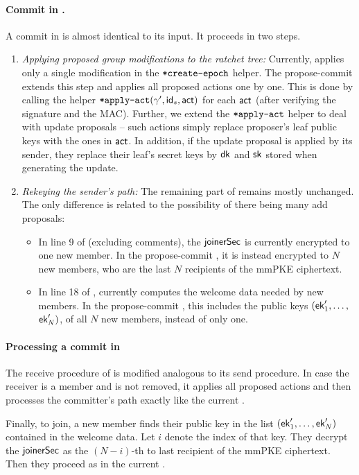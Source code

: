 \paragraph{Commit in \saik.}
A commit in \saik is almost identical to its  input. It proceeds in two steps.
\begin{enumerate}
	\item {\it Applying proposed group modifications to the ratchet tree:} Currently, \saik applies only a single modification in the ${\textnormal{\tt*create-epoch}}$ helper. The propose-commit \saik extends this step and applies all proposed actions one by one. This is done by calling the helper ${\textnormal{\tt*apply-act}}(\gamma', {\mathsf{id}}_s, \mathsf{act})$ for each $\mathsf{act}$ (after verifying the signature and the MAC). Further, we extend the ${\textnormal{\tt*apply-act}}$ helper to deal with update proposals -- such actions simply replace proposer's leaf public keys with the ones in $\mathsf{act}$. In addition, if the update proposal is applied by its sender, they replace their leaf's secret keys by ${\mathsf{dk}}$ and ${\mathsf{sk}}$ stored when generating the update.
	\item {\it Rekeying the sender's path:} The remaining part of  remains mostly unchanged. The only difference is related to the possibility of there being many add proposals:
	\begin{itemize}
		\item In line 9 of  (excluding comments), the ${\mathsf{joinerSec}}$ is currently encrypted to one new member. In the propose-commit \saik, it is instead encrypted to $N$ new members, who are the last $N$ recipients of the mmPKE ciphertext.
		\item In line 18 of , \saik currently computes the welcome data needed by new members. In the propose-commit \saik, this includes the public keys $({\mathsf{ek}}'_1, \dots,$ ${\mathsf{ek}}'_N)$, of all $N$ new members, instead of only one. 
	\end{itemize} 
\end{enumerate}

\paragraph{Processing a commit in \saik}
The receive procedure of \saik is modified analogous to its send procedure. In case the receiver is a member and is not removed, it applies all proposed actions and then processes the committer's path exactly like the current \saik.

Finally, to join, a new member finds their public key in the list $({\mathsf{ek}}'_1, \dots,{\mathsf{ek}}'_N)$ contained in the welcome data. Let $i$ denote the index of that key. They decrypt the ${\mathsf{joinerSec}}$ as the $(N-i)$-th to last recipient of the mmPKE ciphertext. Then they proceed as in the current \saik.

